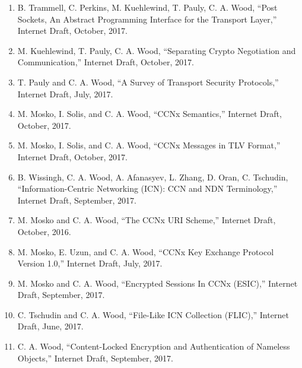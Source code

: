 \documentclass[10pt]{res} %
\begin{document}
\begin{resume}
\begin{enumerate}[D-1.]
    \item B. Trammell, C. Perkins, M. Kuehlewind, T. Pauly, C. A. Wood, ``Post Sockets, An Abstract Programming Interface for the Transport Layer,'' Internet Draft, October, 2017.
    \item M. Kuehlewind, T. Pauly, C. A. Wood, ``Separating Crypto Negotiation and Communication,'' Internet Draft, October, 2017. %
    \item T. Pauly and C. A. Wood, ``A Survey of Transport Security Protocols,'' Internet Draft, July, 2017. %
    \item M. Mosko, I. Solis, and C. A. Wood, ``CCNx Semantics,'' Internet Draft, October, 2017. %
    \item M. Mosko, I. Solis, and C. A. Wood, ``CCNx Messages in TLV Format,'' Internet Draft, October, 2017. %
    \item B. Wissingh, C. A. Wood, A. Afanasyev, L. Zhang, D. Oran, C. Tschudin, ``Information-Centric Networking (ICN): CCN and NDN Terminology,'' Internet Draft, September, 2017.
    \item M. Mosko and C. A. Wood, ``The CCNx URI Scheme,'' Internet Draft, October, 2016. %
    \item M. Mosko, E. Uzun, and C. A. Wood, ``CCNx Key Exchange Protocol Version 1.0,'' Internet Draft, July, 2017. %
    \item M. Mosko and C. A. Wood, ``Encrypted Sessions In CCNx (ESIC),'' Internet Draft, September, 2017. %
    \item C. Tschudin and C. A. Wood, ``File-Like ICN Collection (FLIC),'' Internet Draft, June, 2017.
    \item C. A. Wood, ``Content-Locked Encryption and Authentication of Nameless Objects,'' Internet Draft, September, 2017.
\end{enumerate}


\end{resume}
\end{document}
